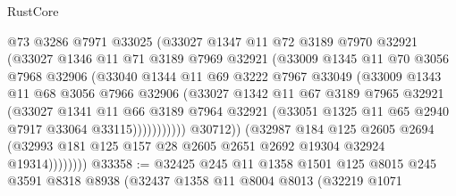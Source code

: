 \begin{lexlean}{RustCore}
\begin{coremodule}
                          @73
                          @3286
                          @7971
                          @33025
                          (@33027
                            @1347
                            @11
                            @72
                            @3189
                            @7970
                            @32921
                            (@33027
                              @1346
                              @11
                              @71
                              @3189
                              @7969
                              @32921
                              (@33009
                                @1345
                                @11
                                @70
                                @3056
                                @7968
                                @32906
                                (@33040
                                  @1344
                                  @11
                                  @69
                                  @3222
                                  @7967
                                  @33049
                                  (@33009
                                    @1343
                                    @11
                                    @68
                                    @3056
                                    @7966
                                    @32906
                                    (@33027
                                      @1342
                                      @11
                                      @67
                                      @3189
                                      @7965
                                      @32921
                                      (@33027
                                        @1341
                                        @11
                                        @66
                                        @3189
                                        @7964
                                        @32921
                                        (@33051 @1325 @11 @65 @2940 @7917 @33064 @33115)))))))))))
                    @30712))
                (@32987
                  @184
                  @125
                  @2605
                  @2694
                  (@32993 @181 @125 @157 @28 @2605 @2651 @2692 @19304 @32924 @19314))))))))
@33358 := @32425
    @245
    @11
    @1358
    @1501
    @125
    @8015
    @245
    @3591
    @8318
    @8938
    (@32437
      @1358
      @11
      @8004
      @8013
      (@32219
        @1071

\end{coremodule}
\end{lexlean}
